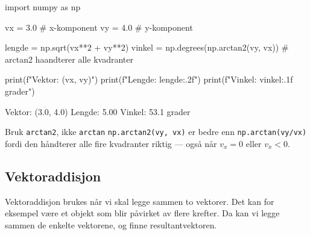 \begin{pythonkode}
import numpy as np

vx = 3.0    # x-komponent
vy = 4.0    # y-komponent

lengde = np.sqrt(vx**2 + vy**2)
vinkel = np.degrees(np.arctan2(vy, vx))  # arctan2 haandterer alle kvadranter

print(f"Vektor:  ({vx}, {vy})")
print(f"Lengde:  {lengde:.2f}")
print(f"Vinkel:  {vinkel:.1f} grader")
\end{pythonkode}
\begin{pythonoutput}
Vektor:  (3.0, 4.0)
Lengde:  5.00
Vinkel:  53.1 grader
\end{pythonoutput}

\begin{mymerk*}{Bruk \texttt{arctan2}, ikke \texttt{arctan}}
\texttt{np.arctan2(vy, vx)} er bedre enn \texttt{np.arctan(vy/vx)} fordi den håndterer alle fire kvadranter riktig — også når $v_x = 0$ eller $v_x < 0$.
\end{mymerk*}


\subsection{Vektoraddisjon}
Vektoraddisjon brukes når vi skal legge sammen to vektorer. Det kan for eksempel være et objekt som blir påvirket av flere krefter. Da kan vi legge sammen de enkelte vektorene, og finne resultantvektoren. 


